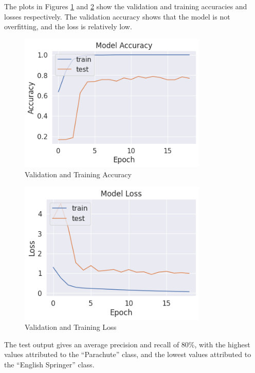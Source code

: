 The plots in Figures \ref{fig:q1pdacc} and \ref{fig:q1pdloss} show the
validation and training accuracies and losses respectively. The
validation accuracy shows that the model is not overfitting, and the loss is
relatively low.

\begin{figure}[H]
	\centering
	\includegraphics[width=0.8\textwidth]{images/q1/pd/accuracy}
	\caption{Validation and Training Accuracy}
	\label{fig:q1pdacc}
\end{figure}

\begin{figure}[H]
	\centering
	\includegraphics[width=0.8\textwidth]{images/q1/pd/loss}
	\caption{Validation and Training Loss}
	\label{fig:q1pdloss}
\end{figure}

The test output gives an average precision and recall of 80\%, with the highest
values attributed to the ``Parachute'' class, and the lowest values attributed
to the ``English Springer'' class.

